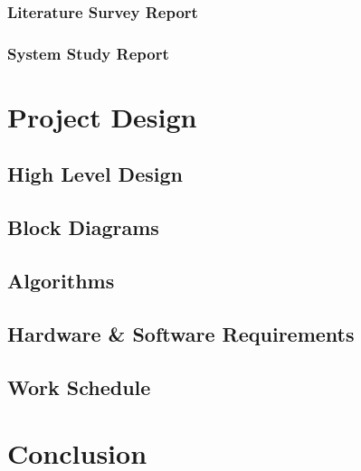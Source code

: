 \documentclass[11pt]{report}
\begin{document}
\subsection{Literature Survey Report}
\subsection{System Study Report}



\chapter{Project Design}
 \label{xx}

\section{High Level Design}
\section{Block Diagrams}


\section{Algorithms}

\section{Hardware \& Software Requirements}
\section{Work Schedule}


 \chapter{Conclusion}
 \label {con}


 
\end{document}
